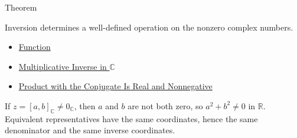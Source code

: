 \begin{theorembox}{Theorem}
\begin{theorem}
\label{thm:inversion-on-c-well-defined}
Inversion determines a well-defined operation on the nonzero complex numbers.
\end{theorem}
\end{theorembox}

\begin{dependencies}
\begin{itemize}
  \item \hyperref[def:function]{Function}
  \item \hyperref[def:multiplicative-inverse-on-c]{Multiplicative Inverse in $\mathbb{C}$}
  \item \hyperref[lem:complex-product-with-conjugate]{Product with the Conjugate Is Real and Nonnegative}
\end{itemize}
\end{dependencies}

\begin{remark*}
If \(z=[a,b]_{\mathbb{C}}\ne0_{\mathbb{C}}\), then \(a\) and \(b\) are not
both zero, so \(a^2+b^2\ne0\) in \(\mathbb{R}\). Equivalent representatives
have the same coordinates, hence the same denominator and the same inverse
coordinates.
\end{remark*}
